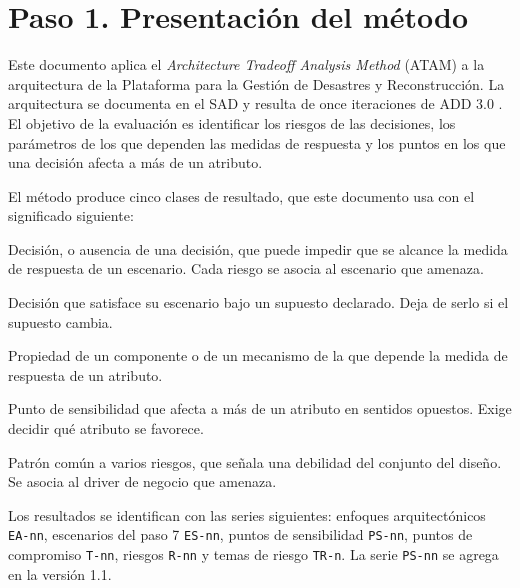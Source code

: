 \documentclass[11pt,letterpaper]{article}
\begin{document}
\tableofcontents
\newpage

\section{Paso 1. Presentación del método}
\label{sec:paso1}

Este documento aplica el \emph{Architecture Tradeoff Analysis Method} (ATAM) \cite{kazman,bass} a
la arquitectura de la Plataforma para la Gestión de Desastres y Reconstrucción. La arquitectura se
documenta en el SAD \cite{sad} y resulta de once iteraciones de ADD 3.0 \cite{iteraciones}. El
objetivo de la evaluación es identificar los riesgos de las decisiones, los parámetros de los que
dependen las medidas de respuesta y los puntos en los que una decisión afecta a más de un atributo.

El método produce cinco clases de resultado, que este documento usa con el significado siguiente:

\begin{description}[leftmargin=3.8cm,labelwidth=3.5cm,labelsep=0.3cm]
  \item[Riesgo] Decisión, o ausencia de una decisión, que puede impedir que se alcance la medida de
        respuesta de un escenario. Cada riesgo se asocia al escenario que amenaza.
  \item[No riesgo] Decisión que satisface su escenario bajo un supuesto declarado. Deja de serlo si
        el supuesto cambia.
  \item[Punto de sensibilidad] Propiedad de un componente o de un mecanismo de la que depende la
        medida de respuesta de un atributo.
  \item[Punto de compromiso] Punto de sensibilidad que afecta a más de un atributo en sentidos
        opuestos. Exige decidir qué atributo se favorece.
  \item[Tema de riesgo] Patrón común a varios riesgos, que señala una debilidad del conjunto del
        diseño. Se asocia al driver de negocio que amenaza.
\end{description}

Los resultados se identifican con las series siguientes: enfoques arquitectónicos \texttt{EA-nn},
escenarios del paso 7 \texttt{ES-nn}, puntos de sensibilidad \texttt{PS-nn}, puntos de compromiso
\texttt{T-nn}, riesgos \texttt{R-nn} y temas de riesgo \texttt{TR-n}. La serie \texttt{PS-nn} se
agrega en la versión 1.1.
\end{document}
